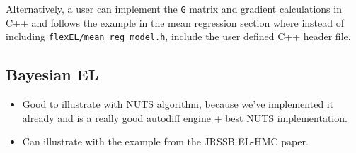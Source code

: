 \documentclass[article]{jss}
\renewcommand{\|}{\,|\,}
\begin{document}
Alternatively, a user can implement the \texttt{G} matrix and gradient calculations in C++ and follows the example in the mean regression section where instead of including \texttt{flexEL/mean\_reg\_model.h}, include the user defined C++ header file.

\hypertarget{bayesian-el}{%
\subsection{Bayesian EL}\label{bayesian-el}}

\begin{itemize}
\item
  Good to illustrate with  NUTS algorithm, because we've implemented it already and  is a really good autodiff engine + best NUTS implementation.
\item
  Can illustrate with the example from the JRSSB EL-HMC paper.
\end{itemize}
\end{document}
